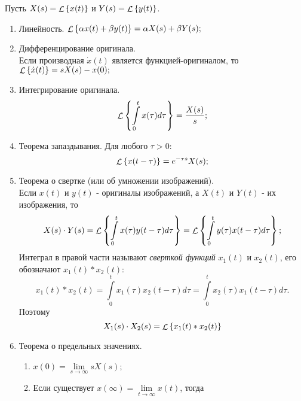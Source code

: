 \documentclass[../../TAU.tex]{subfiles}
\begin{document}
    Пусть 
    $X(s) = \mathop{\mathcal{L}}\nolimits\left\{x(t)\right\}$ и 
    $Y(s) = \mathop{\mathcal{L}}\nolimits\left\{y(t)\right\}$.
    \begin{enumerate}
        \item Линейность. $\mathop{\mathcal{L}}\nolimits\left\{\alpha x(t) + \beta y(t)\right\} = \alpha X(s) + \beta Y(s);$
        \item Дифференцирование оригинала. \\
            Если производная 
            $\dot x(t)$ 
            является функцией-оригиналом, то 
            $\mathop{\mathcal{L}}\nolimits\left\{\dot x(t)\right\} = sX(s) - x(0);$
        \item Интегрирование оригинала.
            \begin{equation}
                \mathop{\mathcal{L}}\nolimits\left\{\int\limits_0^tx(\tau)d\tau\right\} = \frac{X(s)}{s};
            \end{equation}
        \item Теорема запаздывания. Для любого $\tau>0$:
            \begin{equation}
                \mathop{\mathcal{L}}\nolimits\left\{x(t-\tau)\right\} = e^{-\tau s}X(s);
            \end{equation}
        \item  Теорема о свертке (или об умножении изображений).\\
            Если $x(t)$ и $y(t)$ - оригиналы изображений, а $X(t)$ и $Y(t)$ - их изображения, то
            \begin{equation}
                X(s)\cdot Y(s) = \mathop{\mathcal{L}}\nolimits\left\{\int\limits_0^tx(\tau)y(t-\tau)d\tau\right\} = \mathop{\mathcal{L}}\nolimits\left\{\int\limits_0^ty(\tau)x(t-\tau)d\tau\right\};
            \end{equation}
            Интеграл в правой части называют {\it сверткой функций} $x_1(t)$ и $x_2(t)$, его обозначают $x_1(t) * x_2(t)$:
            \begin{equation}
                x_1(t)*x_2(t) = \int\limits_0^t x_1(\tau) x_2(t-\tau) d{\tau} = \int\limits_0^t x_2(\tau) x_1(t-\tau)d\tau.
            \end{equation}
            Поэтому 
            \begin{equation}
                X_1(s) \cdot X_2(s) = \mathop{\mathcal{L}}\nolimits\left\{x_1(t) * x_2(t)\right\}
            \end{equation}
        \item Теорема о предельных значениях.
            \begin{enumerate}[label*={\arabic*}]
                \item 
                    $x(0) = \lim\limits_{s\rightarrow\infty}sX(s)$;
                \item Если существует 
                    $x(\infty) = \lim\limits_{t\rightarrow\infty} x(t)$, тогда 

\end{enumerate}
\end{enumerate}
\end{document}
